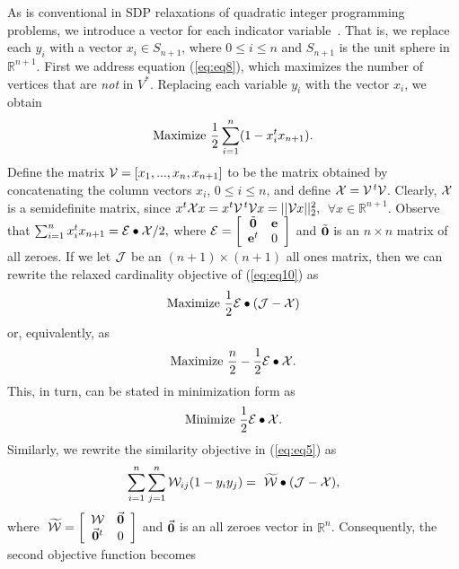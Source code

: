 \documentclass{ieee}
\def\E{{\cal E}}
\def\J{{\cal J}}
\def\V{{\cal V}}
\def\W{{\cal W}}
\def\X{{\cal X}}
\def\SR{{\mathbb{R}}}
\def\e{{\bf e}}
\begin{document}
As is conventional in SDP relaxations of quadratic integer programming
problems, we introduce a vector for each indicator
variable~\cite{vandenberghe96semidefinite,goemans97semidefinite}.  That is, we replace each
$y_i$ with a vector $x_i \in S_{n+1}$, where $0 \leq i \leq n$ and
$S_{n+1}$ is the unit sphere in $\SR^{n+1}$. First we address equation
(\ref{eq:eq8}), which maximizes the number of vertices that are
\emph{not} in $V^*$. Replacing each
variable $y_i$ with the vector $x_i$, we obtain
\begin{equation}
\label{eq:eq10}
{\rm Maximize}\ {\frac{1}{2}}\sum_{i=1}^n (1-x_i^tx_{n+1}).
\end{equation}
Define the matrix $\V=[x_1,...,x_n,x_{n+1}]$ to be the matrix obtained by
concatenating the column vectors $x_i$, $0\le i\le n$, and define
$\X=\V^{\,t}\V$. Clearly,  $\X$ is a semidefinite matrix, since
$x^t \X x =x^t \V^{\,t}\V x=||\V x||_2^2,$ $\ \forall x\in \SR^{n+1}.$
Observe that
$\sum_{i=1}^n x_i^tx_{n+1}= \E \bullet \X/2,$
where $ \E= \left [ 
\begin{array}{cc}
\tilde{\bf 0} & \e \\
\e^t & 0 
\end{array} 
\right]$ and $\tilde{\bf 0}$ is an $n\times n$ matrix of all zeroes. 
If we let $\J$ be an $(n+1)\times(n+1)$ all ones matrix, then we can
rewrite the relaxed cardinality objective of (\ref{eq:eq10}) as
\begin{equation}
\label{eq:eq11}
{\rm Maximize }\ \frac{1}{2}\E \bullet(\J-\X)
\end{equation}
or, equivalently, as 
\begin{equation}
\label{eq:eq13}
{\rm Maximize }\ {\frac{n}{2}-\frac{1}{2}\E \bullet \X}.
\end{equation}
This, in turn, can be stated in minimization form as
\begin{equation}
\label{eq:eq14}
{\rm Minimize }\ {\frac{1}{2}\E \bullet \X}.
\end{equation}
Similarly, we rewrite the similarity objective in (\ref{eq:eq5}) as
\begin{displaymath}
  \sum_{i=1}^n\sum_{j=1}^n \W_{ij}(1-y_iy_j)=~\widetilde{\W} \bullet (\J-\X),
\end{displaymath}
where $
~\widetilde{\W}= \left[
\begin{array}{cc}
\W & \vec{\bf 0} \\
\vec{\bf 0}^t & 0  
\end{array}
\right]
$ and $\vec{\bf 0}$ is an all zeroes vector in $\SR^n$. 
Consequently, the second objective function becomes
\end{document}
